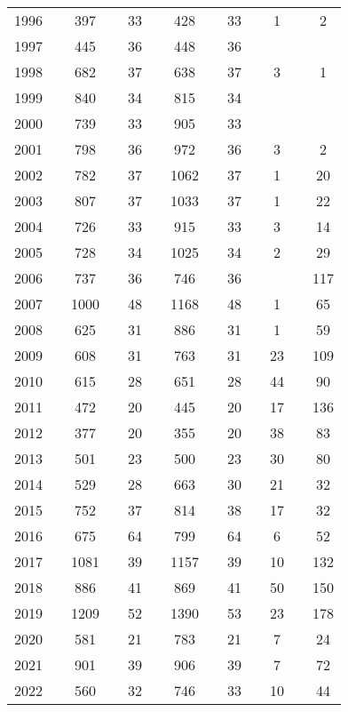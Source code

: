 \begin{table}[]
\begin{tabular}{rlclccccccccc}
1996 &  & 397 &  & 33 &  & 428 &  & 33 &  & 1 &  & 2 \\
1997 &  & 445 &  & 36 &  & 448 &  & 36 &  &  &  &  \\
1998 &  & 682 &  & 37 &  & 638 &  & 37 &  & 3 &  & 1 \\
1999 &  & 840 &  & 34 &  & 815 &  & 34 &  &  &  &  \\
2000 &  & 739 &  & 33 &  & 905 &  & 33 &  &  &  &  \\
2001 &  & 798 &  & 36 &  & 972 &  & 36 &  & 3 &  & 2 \\
2002 &  & 782 &  & 37 &  & 1062 &  & 37 &  & 1 &  & 20 \\
2003 &  & 807 &  & 37 &  & 1033 &  & 37 &  & 1 &  & 22 \\
2004 &  & 726 &  & 33 &  & 915 &  & 33 &  & 3 &  & 14 \\
2005 &  & 728 &  & 34 &  & 1025 &  & 34 &  & 2 &  & 29 \\
2006 &  & 737 &  & 36 &  & 746 &  & 36 &  &  &  & 117 \\
2007 &  & 1000 &  & 48 &  & 1168 &  & 48 &  & 1 &  & 65 \\
2008 &  & 625 &  & 31 &  & 886 &  & 31 &  & 1 &  & 59 \\
2009 &  & 608 &  & 31 &  & 763 &  & 31 &  & 23 &  & 109 \\
2010 &  & 615 &  & 28 &  & 651 &  & 28 &  & 44 &  & 90 \\
2011 &  & 472 &  & 20 &  & 445 &  & 20 &  & 17 &  & 136 \\
2012 &  & 377 &  & 20 &  & 355 &  & 20 &  & 38 &  & 83 \\
2013 &  & 501 &  & 23 &  & 500 &  & 23 &  & 30 &  & 80 \\
2014 &  & 529 &  & 28 &  & 663 &  & 30 &  & 21 &  & 32 \\
2015 &  & 752 &  & 37 &  & 814 &  & 38 &  & 17 &  & 32 \\
2016 &  & 675 &  & 64 &  & 799 &  & 64 &  & 6 &  & 52 \\
2017 &  & 1081 &  & 39 &  & 1157 &  & 39 &  & 10 &  & 132 \\
2018 &  & 886 &  & 41 &  & 869 &  & 41 &  & 50 &  & 150 \\
2019 &  & 1209 &  & 52 &  & 1390 &  & 53 &  & 23 &  & 178 \\
2020 &  & 581 &  & 21 &  & 783 &  & 21 &  & 7 &  & 24 \\
2021 &  & 901 &  & 39 &  & 906 &  & 39 &  & 7 &  & 72 \\
2022 &  & 560 &  & 32 &  & 746 &  & 33 &  & 10 &  & 44
\end{tabular}
\end{table}
\endgroup{}
\endgroup{}